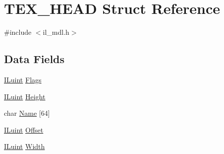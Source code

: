 \hypertarget{struct_t_e_x___h_e_a_d}{\section{T\-E\-X\-\_\-\-H\-E\-A\-D Struct Reference}
\label{struct_t_e_x___h_e_a_d}
}


{\ttfamily \#include $<$il\-\_\-mdl.\-h$>$}

\subsection*{Data Fields}
\begin{DoxyCompactItemize}
\item 
\hyperlink{il_8h_ac6508d0e9c19e32f32e00d54b5b8cf30}{I\-Luint} \hyperlink{struct_t_e_x___h_e_a_d_ad5c4db01d6ffdff05862b7052afa79fc}{Flags}
\item 
\hyperlink{il_8h_ac6508d0e9c19e32f32e00d54b5b8cf30}{I\-Luint} \hyperlink{struct_t_e_x___h_e_a_d_a8a8093d76b61a95fc96df24af29b107a}{Height}
\item 
char \hyperlink{struct_t_e_x___h_e_a_d_aa89339d079ce1d91fdfa754d0969a8a5}{Name} \mbox{[}64\mbox{]}
\item 
\hyperlink{il_8h_ac6508d0e9c19e32f32e00d54b5b8cf30}{I\-Luint} \hyperlink{struct_t_e_x___h_e_a_d_a3b5617e246c8182c704c5369dec7f049}{Offset}
\item 
\hyperlink{il_8h_ac6508d0e9c19e32f32e00d54b5b8cf30}{I\-Luint} \hyperlink{struct_t_e_x___h_e_a_d_a4146e7b2b0b4097e0e335f9b348392bf}{Width}
\end{DoxyCompactItemize}


